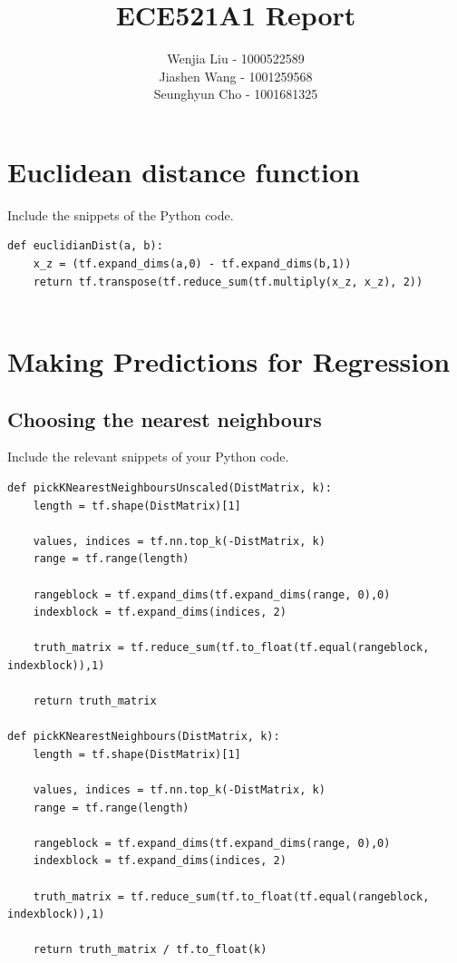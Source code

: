 \documentclass{article}
\title{ECE521A1 Report}
\author{Wenjia Liu - 1000522589\\Jiashen Wang - 1001259568\\Seunghyun Cho - 1001681325}
\begin{document}
\maketitle

\section{Euclidean distance function}
Include the snippets of the Python code.

\begin{verbatim}
def euclidianDist(a, b):
    x_z = (tf.expand_dims(a,0) - tf.expand_dims(b,1))
    return tf.transpose(tf.reduce_sum(tf.multiply(x_z, x_z), 2))
  
\end{verbatim}


\section{Making Predictions for Regression}
\subsection{Choosing the nearest neighbours}
Include the relevant snippets of your Python code.
\begin{verbatim}
def pickKNearestNeighboursUnscaled(DistMatrix, k):
    length = tf.shape(DistMatrix)[1]
    
    values, indices = tf.nn.top_k(-DistMatrix, k)
    range = tf.range(length)
    
    rangeblock = tf.expand_dims(tf.expand_dims(range, 0),0)
    indexblock = tf.expand_dims(indices, 2)
    
    truth_matrix = tf.reduce_sum(tf.to_float(tf.equal(rangeblock, indexblock)),1)

    return truth_matrix

def pickKNearestNeighbours(DistMatrix, k):
    length = tf.shape(DistMatrix)[1]
    
    values, indices = tf.nn.top_k(-DistMatrix, k)
    range = tf.range(length)
    
    rangeblock = tf.expand_dims(tf.expand_dims(range, 0),0)
    indexblock = tf.expand_dims(indices, 2)
    
    truth_matrix = tf.reduce_sum(tf.to_float(tf.equal(rangeblock, indexblock)),1)

    return truth_matrix / tf.to_float(k)
\end{verbatim}
\end{document}
